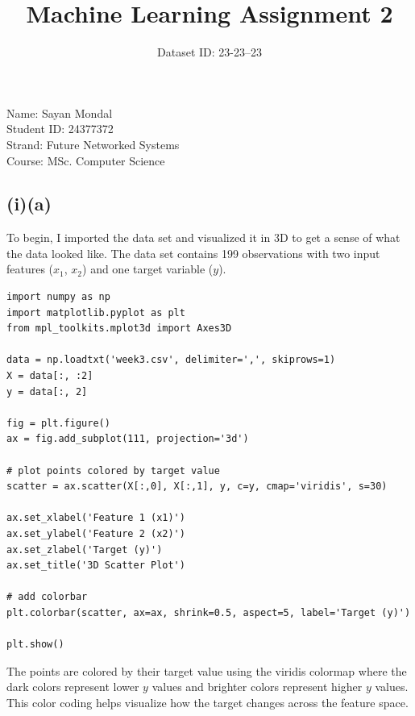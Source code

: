 \documentclass[11pt,a4paper]{article}
\title{Machine Learning Assignment 2}
\author{Dataset ID: 23-23--23}
\date{}
\begin{document}
\maketitle

\begin{center}
Name: Sayan Mondal\\
Student ID: 24377372\\
Strand: Future Networked Systems\\
Course: MSc. Computer Science
\end{center}
    
\vspace{1em}

\subsection*{(i)(a)}

To begin, I imported the data set and visualized it in 3D to get a sense of what the data looked like. The data set contains 199 observations with two input features ($x_1$, $x_2$) and one target variable ($y$).

\begin{lstlisting}
import numpy as np
import matplotlib.pyplot as plt
from mpl_toolkits.mplot3d import Axes3D

data = np.loadtxt('week3.csv', delimiter=',', skiprows=1)
X = data[:, :2]
y = data[:, 2]

fig = plt.figure()
ax = fig.add_subplot(111, projection='3d')

# plot points colored by target value
scatter = ax.scatter(X[:,0], X[:,1], y, c=y, cmap='viridis', s=30)

ax.set_xlabel('Feature 1 (x1)')
ax.set_ylabel('Feature 2 (x2)')
ax.set_zlabel('Target (y)')
ax.set_title('3D Scatter Plot')

# add colorbar
plt.colorbar(scatter, ax=ax, shrink=0.5, aspect=5, label='Target (y)')

plt.show()
\end{lstlisting}

The points are colored by their target value using the viridis colormap where the dark colors represent lower $y$ values and brighter colors represent higher $y$ values. This color coding helps visualize how the target changes across the feature space.
\end{document}
